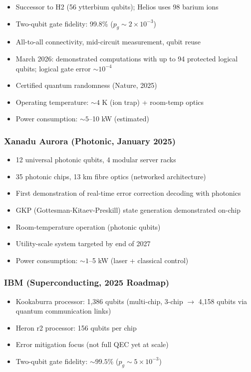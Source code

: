 \documentclass[11pt]{article}
\theoremstyle{definition}
\theoremstyle{remark}
\newcommand{\ee}[1]{\times 10^{#1}}
\begin{document}
\begin{itemize}[nosep]
\item Successor to H2 (56 ytterbium qubits); Helios uses 98 barium ions
\item Two-qubit gate fidelity: 99.8\% ($p_g \sim 2\ee{-3}$)
\item All-to-all connectivity, mid-circuit measurement, qubit reuse
\item March 2026: demonstrated computations with up to 94 protected
  logical qubits; logical gate error $\sim 10^{-4}$
\item Certified quantum randomness (Nature, 2025)
\item Operating temperature: $\sim 4$ K (ion trap) + room-temp optics
\item Power consumption: $\sim 5$--10 kW (estimated)
\end{itemize}

\subsubsection{Xanadu Aurora (Photonic, January 2025)}

\begin{itemize}[nosep]
\item 12 universal photonic qubits, 4 modular server racks
\item 35 photonic chips, 13 km fibre optics (networked architecture)
\item First demonstration of real-time error correction decoding with
  photonics
\item GKP (Gottesman-Kitaev-Preskill) state generation demonstrated
  on-chip
\item Room-temperature operation (photonic qubits)
\item Utility-scale system targeted by end of 2027
\item Power consumption: $\sim 1$--5 kW (laser + classical control)
\end{itemize}

\subsubsection{IBM (Superconducting, 2025 Roadmap)}

\begin{itemize}[nosep]
\item Kookaburra processor: 1,386 qubits (multi-chip, 3-chip $\to$
  4,158 qubits via quantum communication links)
\item Heron r2 processor: 156 qubits per chip
\item Error mitigation focus (not full QEC yet at scale)
\item Two-qubit gate fidelity: $\sim 99.5\%$ ($p_g \sim 5\ee{-3}$)
\end{itemize}
\end{document}
